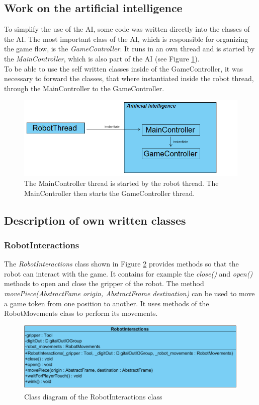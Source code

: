 \documentclass[a4paper]{spie}  %
\begin{document}
\begin{large}
\subsection{Work on the artificial intelligence}
To simplify the use of the AI, some code was written directly into the classes of the AI. The most important class of the AI, which is responsible for organizing the game flow, is the \emph{GameController}. It runs in an own thread and is started by the \emph{MainController}, which is also part of the AI (see Figure \ref{thread_diagram}).\\
To be able to use the self written classes inside of the GameController, it was necessary to forward the classes, that where instantiated inside the robot thread, through the MainController to the GameController.
\begin{figure}[h]
\includegraphics[width=15cm]{images/diagram.png}
\centering
\caption{The MainController thread is started by the robot thread. The MainController then starts the GameController thread.}
\label{thread_diagram}
\end{figure}
\subsection{Description of own written classes}
\subsubsection{RobotInteractions}
The \emph{RobotInteractions} class shown in Figure \ref{class_roboInt} provides methods so that the robot can interact with the game. It contains for example the \emph{close()} and \emph{open()} methods to open and close the gripper of the robot. The method \emph{movePiece(AbstractFame origin, AbstractFrame destination)} can be used to move a game token from one position to another. It uses methods of the RobotMovements class to perform its movements.
\begin{figure}[h]
\includegraphics[width=15cm]{images/class_roboInt.png}
\centering
\caption{Class diagram of the RobotInteractions class}
\label{class_roboInt}
\end{figure}


\end{large}
\end{document}
